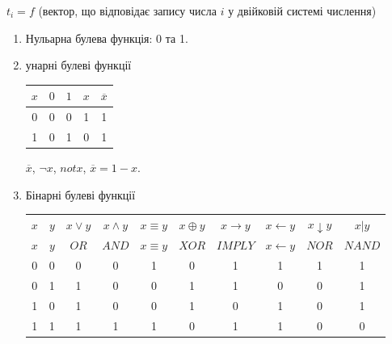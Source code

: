 $t_i = f$ (вектор, що відповідає запису числа $i$ у двійковій системі числення)

\begin{enumerate}
    \item Нульарна булева функція: 0 та 1.
    \item унарні булеві функції
    \begin{center}
        \begin{tabular}{c||c|c|c|c}
            $x$ & $0$ & $1$ & $x$ & $\overline{x}$ \\\hline\hline
            0 & 0 & 0 & 1 & 1  \\\hline
            1 & 0 & 1 & 0 & 1  \\ 
        \end{tabular}
    \end{center}

    \begin{remark}
        $\overline{x}$, $\neg x$, $not x$, $\overline{x} = 1 - x$.
    \end{remark}
    \item Бінарні булеві функції

    \begin{center}
        \begin{tabular}{cc||c|c|c|c|c|c|c|c}
            $x$ & $y$ & $x \vee y$ & $x \wedge y$ & $x \equiv y$ & $x \oplus y$ & $x \rightarrow y$ & $x \leftarrow y$ & $x \downarrow y$ & $x|y$ \\
            $x$ & $y$ & $OR$ & $AND$ & $x \equiv y$ & $XOR$ & $IMPLY$ & $x \leftarrow y$ & $NOR$ & $NAND$ \\
            \hline\hline
            0&0& 0 & 0 & 1 & 0 & 1 & 1 & 1 & 1 \\ 
            0&1& 1 & 0 & 0 & 1 & 1 & 0 & 0 & 1 \\ 
            1&0& 1 & 0 & 0 & 1 & 0 & 1 & 0 & 1 \\ 
            1&1& 1 & 1 & 1 & 0 & 1 & 1 & 0 & 0 \\ 
        \end{tabular}
    \end{center}


\end{enumerate}
